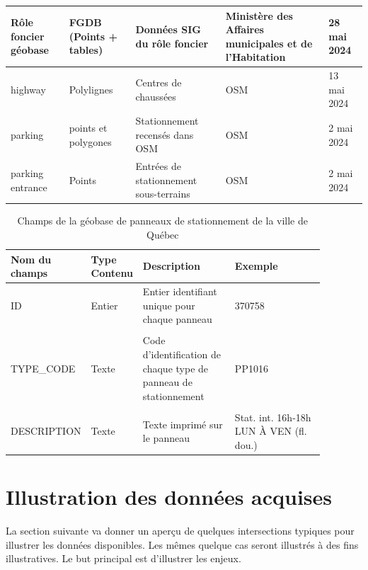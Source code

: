 \begin{landscape}
\begin{longtable}[h!]{p{.2 \linewidth} p{.1 \linewidth} p{.3 \linewidth} p{.15\linewidth} p{.125\linewidth} }
    \hline
    Rôle foncier géobase & FGDB (Points + tables) & Données SIG du rôle foncier & Ministère des Affaires municipales et de l'Habitation & 28 mai 2024 \\
    \hline
    highway & Polylignes & Centres de chaussées & \ac{OSM} & 13 mai 2024\\
    \hline
    parking & points et polygones & Stationnement recensés dans \ac{OSM} & \ac{OSM} & 2 mai 2024 \\
    \hline
      parking entrance & Points & Entrées de stationnement sous-terrains  & \ac{OSM} & 2 mai 2024 \\
      \hline
    
  \end{longtable}

  \begin{table}[h!]
    \centering
    \begin{tabular}{p{0.18\linewidth} | p{0.1\linewidth} | p{0.3\linewidth} | p{0.3\linewidth}} 
    \hline
    Nom du champs & Type Contenu & Description  & Exemple\\ 
    \hline
    ID             & Entier    & Entier identifiant unique pour chaque panneau  & 370758 \\ 
    & & & \\
    TYPE\_CODE      & Texte     & Code d'identification de chaque type de panneau de stationnement & PP1016\\
    & & & \\
    DESCRIPTION     & Texte     & Texte imprimé sur le panneau & Stat. int. 16h-18h LUN À VEN (fl. dou.)\\
    \hline
    \end{tabular}
    \caption{Champs de la géobase de panneaux de stationnement de la ville de Québec \parencite{VilledeQuebec:PanneauxSignalisation:2024}}
    \label{tab:champs_geobase_stationnement_quebec}
  \end{table}
  \end{landscape}
\section{Illustration des données acquises}
  La section suivante va donner un aperçu de quelques intersections typiques pour illustrer les données disponibles. Les mêmes quelque cas seront illustrés à des fins illustratives. Le but principal est d'illustrer les enjeux.
